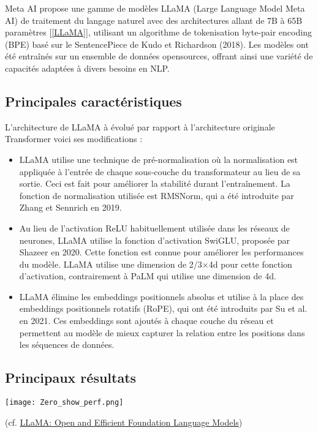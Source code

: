 \documentclass[11pt]{rapport_class}
\begin{document}
\qquad Meta AI propose une gamme de modèles LLaMA (Large Language Model Meta AI) de traitement du langage naturel avec des architectures allant de 7B à 65B paramètres [\ref{LLaMA}], utilisant un algorithme de tokenisation byte-pair encoding (BPE) basé sur le SentencePiece de Kudo et Richardson (2018). Les modèles ont été entraînés sur un ensemble de données opensources, offrant ainsi une variété de capacités adaptées à divers besoins en NLP.

\subsection{Principales caractéristiques}

\qquad L’architecture de LLaMA à évolué par rapport à l’architecture originale Transformer voici ses modifications : 
\begin{itemize}
\item LLaMA utilise une technique de pré-normalisation où la normalisation est appliquée à l'entrée de chaque sous-couche du transformateur au lieu de sa sortie. Ceci est fait pour améliorer la stabilité durant l'entraînement. La fonction de normalisation utilisée est RMSNorm, qui a été introduite par Zhang et Sennrich en 2019.
\item Au lieu de l'activation ReLU habituellement utilisée dans les réseaux de neurones, LLaMA utilise la fonction d'activation SwiGLU, proposée par Shazeer en 2020. Cette fonction est connue pour améliorer les performances du modèle. LLaMA utilise une dimension de 2/3×4d pour cette fonction d'activation, contrairement à PaLM qui utilise une dimension de 4d.
\item LLaMA élimine les embeddings positionnels absolus et utilise à la place des embeddings positionnels rotatifs (RoPE), qui ont été introduits par Su et al. en 2021. Ces embeddings sont ajoutés à chaque couche du réseau et permettent au modèle de mieux capturer la relation entre les positions dans les séquences de données.
\end{itemize}



\subsection{Principaux résultats}
\begin{center}
    \texttt{[image: Zero\_show\_perf.png]}\\

    \begin{tiny}
        (cf. \href{https://arxiv.org/pdf/2302.13971.pdf}{LLaMA: Open and Efficient Foundation Language Models})
    \end{tiny}
\end{center}
\end{document}
